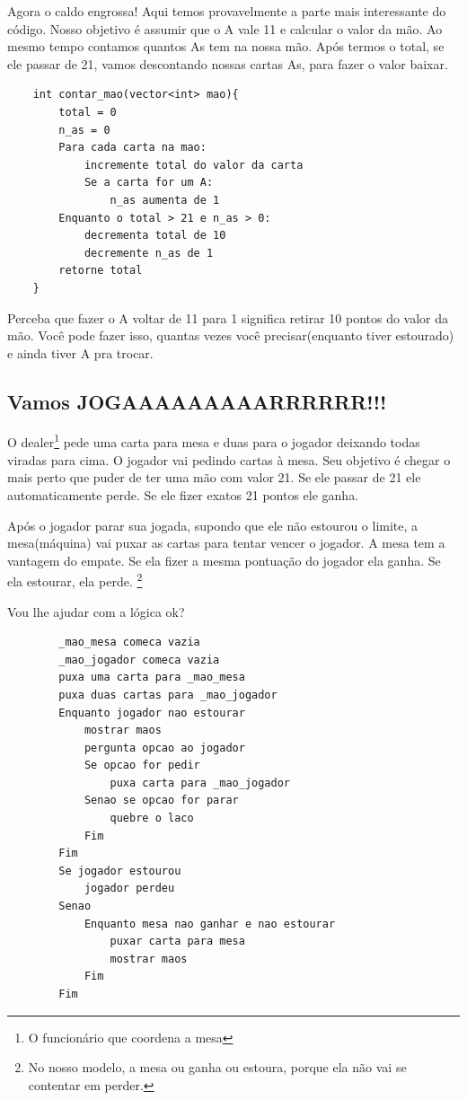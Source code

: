 \documentclass[12pt]{article}
\newcommand{\note}[1]{\footnote{#1}} %
\begin{document}
Agora o caldo engrossa! Aqui temos provavelmente a parte mais interessante do
código. Nosso objetivo é assumir que o A vale 11 e calcular o valor da mão. Ao
mesmo tempo contamos quantos As tem na nossa mão. Após termos o total, se ele
passar de 21, vamos descontando nossas cartas As, para fazer o valor baixar.

\begin{mdframed}[nobreak=true]
	\begin{lstlisting}
	int contar_mao(vector<int> mao){
		total = 0
		n_as = 0
		Para cada carta na mao:
			incremente total do valor da carta
			Se a carta for um A:
				n_as aumenta de 1
		Enquanto o total > 21 e n_as > 0:
			decrementa total de 10
			decremente n_as de 1
		retorne total
	}
	\end{lstlisting}
\end{mdframed}

Perceba que fazer o A voltar de 11 para 1 significa retirar 10 pontos do valor
da mão. Você pode fazer isso, quantas vezes você precisar(enquanto tiver
estourado) e ainda tiver A pra trocar.

\subsection{Vamos JOGAAAAAAAAARRRRRR!!!}

O dealer\note{O funcionário que coordena a mesa} pede uma carta
para mesa e duas para o jogador deixando todas viradas para cima. O jogador vai
pedindo cartas à mesa. Seu objetivo é chegar o mais perto que puder de ter uma
mão com valor 21. Se ele passar de 21 ele automaticamente perde. Se ele fizer
exatos 21 pontos ele ganha. 

Após o jogador parar sua jogada, supondo que ele não estourou o limite, a
mesa(máquina) vai puxar as cartas para tentar vencer o jogador. A mesa tem a
vantagem do empate. Se ela fizer a mesma pontuação do jogador ela ganha. Se ela
estourar, ela perde. \note{No nosso modelo, a mesa ou ganha ou estoura, porque
ela não vai se contentar em perder.}

Vou lhe ajudar com a lógica ok?

\begin{mdframed}[nobreak=true]
	\begin{lstlisting}
		_mao_mesa comeca vazia
		_mao_jogador comeca vazia
		puxa uma carta para _mao_mesa
		puxa duas cartas para _mao_jogador
		Enquanto jogador nao estourar
			mostrar maos
			pergunta opcao ao jogador
			Se opcao for pedir
				puxa carta para _mao_jogador
			Senao se opcao for parar
				quebre o laco
            Fim
        Fim
        Se jogador estourou
            jogador perdeu 
        Senao
            Enquanto mesa nao ganhar e nao estourar
                puxar carta para mesa
                mostrar maos
            Fim
        Fim

	\end{lstlisting}
\end{mdframed}
\end{document}
